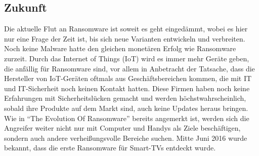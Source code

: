 \subsection{Zukunft}

Die aktuelle Flut an Ransomware ist soweit es geht eingedämmt, wobei es hier nur eine Frage der Zeit ist, bis sich neue Varianten entwickeln und verbreiten. Noch keine Malware hatte den gleichen monetären Erfolg wie Ransomware zurzeit. Durch das Internet of Things (IoT) wird es immer mehr Geräte geben, die anfällig für Ransomware sind, vor allem in Anbetracht der Tatsache, dass die Hersteller von IoT-Geräten oftmals aus Geschäftsbereichen kommen, die mit IT und IT-Sicherheit noch keinen Kontakt hatten. Diese Firmen haben noch keine Erfahrungen mit Sicherheitslücken gemacht und werden höchstwahrscheinlich, sobald ihre Produkte auf dem Markt sind, auch keine Updates heraus bringen.\\
Wie in ``The Evolution Of Ransomware'' bereits angemerkt ist, werden sich die Angreifer weiter nicht nur mit Computer und Handys als Ziele beschäftigen, sondern auch andere verheißungsvolle Bereiche suchen. Mitte Juni 2016 wurde bekannt, dass die erste Ransomware für Smart-TVs entdeckt wurde\cite{smarttv}.
